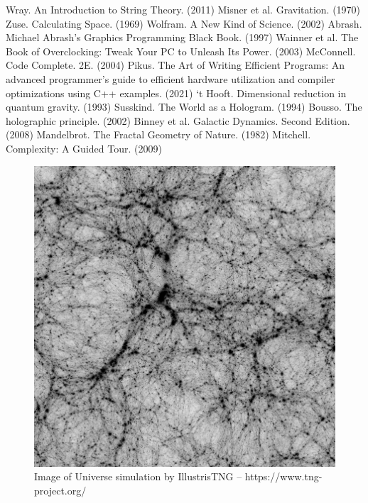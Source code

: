 \documentclass[12pt]{article}
\begin{document}
{%




\pagebreak




\begin{thebibliography}{9}

 Wray. An Introduction to String Theory. (2011)
 Misner et al. Gravitation. (1970)
 Zuse. Calculating Space. (1969)
 Wolfram. A New Kind of Science. (2002)
 Abrash. Michael Abrash's Graphics Programming Black Book. (1997)
 Wainner et al. The Book of Overclocking: Tweak Your PC to Unleash Its Power. (2003)
 McConnell. Code Complete. 2E. (2004)
 Pikus. The Art of Writing Efficient Programs: An advanced programmer's guide to efficient hardware utilization and compiler optimizations using C++ examples. (2021)
 `t Hooft. Dimensional reduction in quantum gravity. (1993)
 Susskind. The World as a Hologram. (1994)
 Bousso. The holographic principle. (2002)
 Binney et al. Galactic Dynamics. Second Edition. (2008)
 Mandelbrot. The Fractal Geometry of Nature. (1982)
 Mitchell. Complexity: A Guided Tour. (2009)








\end{thebibliography}


\pagebreak


\begin{figure} 
\centering
  \includegraphics[width = 2 in]{TNG.png}
  \caption{ Image of Universe simulation by IllustrisTNG -- https://www.tng-project.org/
}
\end{figure}

}
\end{document}
